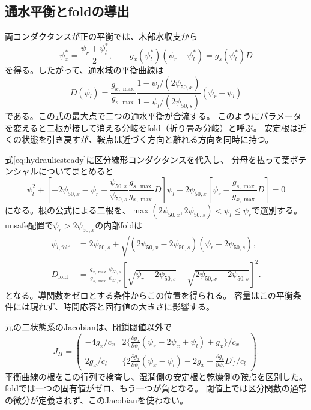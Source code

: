 \documentclass[a4paper,11pt]{ltjsarticle}
\begin{document}
\subsection{通水平衡とfoldの導出}
両コンダクタンスが正の平衡では、木部水収支から
\begin{equation}\label{eq:hydraulicsteady}
 \psi_x^*=\frac{\psi_r+\psi_l^*}{2},\qquad
 g_x(\psi_l^*)(\psi_r-\psi_l^*)=g_s(\psi_l^*)D
\end{equation}
を得る。したがって、通水域の平衡曲線は
\begin{equation}\label{eq:hydrauliccurve}
 D(\psi_l)=\frac{g_{x,\max}}{g_{s,\max}}
 \frac{1-\psi_l/(2\psi_{50,x})}{1-\psi_l/(2\psi_{50,s})}
 (\psi_r-\psi_l)
\end{equation}
である。この式の最大点で二つの通水平衡が合流する。
このようにパラメータを変えると二根が接して消える分岐をfold（折り畳み分岐）と呼ぶ。
安定根は近くの状態を引き戻すが、鞍点は近づく方向と離れる方向を同時に持つ。

式\eqref{eq:hydraulicsteady}に区分線形コンダクタンスを代入し、
分母を払って葉ポテンシャルについてまとめると
\begin{equation}
 \psi_l^2+
 \left[-2\psi_{50,x}-\psi_r+
       \frac{\psi_{50,x}}{\psi_{50,s}}\frac{g_{s,\max}}{g_{x,\max}}D\right]\psi_l
 +2\psi_{50,x}\left[\psi_r-\frac{g_{s,\max}}{g_{x,\max}}D\right]=0
\end{equation}
になる。根の公式による二根を、$\max(2\psi_{50,x},2\psi_{50,s})<\psi_l\le\psi_r$で選別する。
unsafe配置で$\psi_r>2\psi_{50,x}$の内部foldは
\begin{equation}\label{eq:hydraulicfold}
 \begin{aligned}
 \psi_{l,\mathrm{fold}}
 &=2\psi_{50,s}+
 \sqrt{(2\psi_{50,x}-2\psi_{50,s})(\psi_r-2\psi_{50,s})},\\
 D_{\mathrm{fold}}
 &=\frac{g_{x,\max}}{g_{s,\max}}\frac{\psi_{50,s}}{\psi_{50,x}}
 \left[\sqrt{\psi_r-2\psi_{50,s}}-\sqrt{2\psi_{50,x}-2\psi_{50,s}}\right]^2 .
 \end{aligned}
\end{equation}
となる。導関数をゼロとする条件からこの位置を得られる。
容量はこの平衡条件には現れず、時間応答と固有値の大きさに影響する。

元の二状態系のJacobianは、閉鎖閾値以外で
\begin{equation}
 J_H=
 \begin{pmatrix}
 -4g_x/c_x&
 2\{\frac{\partial g_x}{\partial\psi_l}(\psi_r-2\psi_x+\psi_l)+g_x\}/c_x\\
 2g_x/c_l&
 \{2\frac{\partial g_x}{\partial\psi_l}(\psi_x-\psi_l)-2g_x-\frac{\partial g_s}{\partial\psi_l}D\}/c_l
 \end{pmatrix}.
\end{equation}
平衡曲線の根をこの行列で検査し、湿潤側の安定根と乾燥側の鞍点を区別した。
foldでは一つの固有値がゼロ、もう一つが負となる。
閾値上では区分関数の通常の微分が定義されず、このJacobianを使わない。
\end{document}
